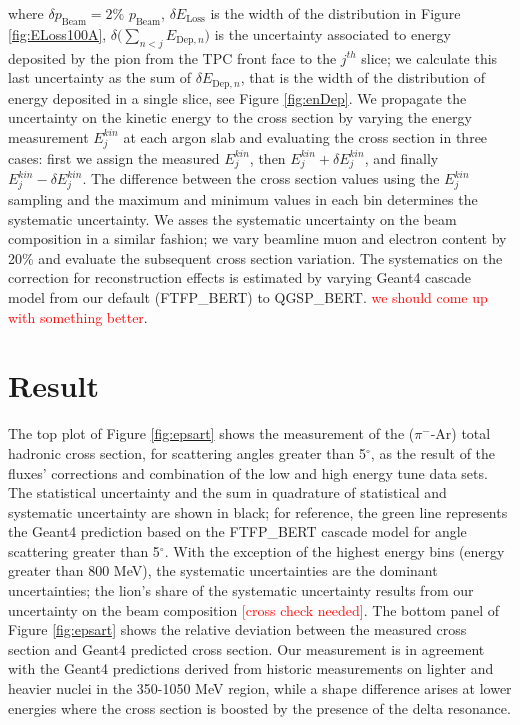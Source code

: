 \documentclass[aps,prl,twocolumn,showpacs,superscriptaddress,groupedaddress]{revtex4}  %
\begin{document}
where $\delta p_{\text{Beam}} = 2\%$ $p_{\text{Beam}}$, $\delta E_{\text{Loss}}$ is the width of the distribution in Figure \ref{fig:ELoss100A}, $\delta \Big(\sum_{n < j} E_{\text{Dep},n}\Big)$  is the uncertainty associated to energy deposited by the pion from the TPC front face to the $j^{th}$ slice; we calculate this last uncertainty as  the sum of $\delta E_{\text{Dep},n}$, that is the width  of the  distribution of energy deposited in a single slice, see Figure \ref{fig:enDep}. We propagate the uncertainty on the kinetic energy to the cross section by varying the energy measurement $E^{kin}_{j}$ at each argon slab and evaluating the cross section in three cases: first we assign the measured $E^{kin}_{j}$, then  $E^{kin}_{j} + \delta E^{kin}_{j}$, and finally  $E^{kin}_{j} - \delta E^{kin}_{j}$. The difference between the cross section values using the $E^{kin}_{j}$ sampling and the maximum and minimum values in each bin determines the systematic uncertainty. We asses the systematic uncertainty on the beam composition in a similar fashion; we vary beamline muon and electron content by 20\% and evaluate the subsequent cross section variation.  The systematics on the correction for reconstruction effects is estimated by varying Geant4 cascade model from our default (FTFP\_BERT) to QGSP\_BERT.  \textcolor{red}{we should come up with something better}. 



\section{\label{sec:Results}Result}
The top plot of Figure \ref{fig:epsart} shows the measurement of the ($\pi^-$-Ar) total hadronic cross section,  for  scattering angles greater than 5$^\circ$, as the result of the fluxes' corrections and combination of the low and high energy tune data sets. The statistical uncertainty and the sum in quadrature of statistical and systematic uncertainty are shown in black; for reference, the green line represents the Geant4 prediction based on the FTFP\_BERT cascade model  for angle scattering greater than 5$^\circ$. 
With the exception of the highest energy bins (energy greater than 800 MeV), the systematic uncertainties are the dominant uncertainties; the lion's share of the systematic uncertainty results from our uncertainty on the beam composition \textcolor{red}{[cross check needed]}. The bottom panel of Figure  \ref{fig:epsart} shows the relative deviation between the measured cross section and  Geant4 predicted cross section.
Our measurement is in agreement with the Geant4 predictions derived from historic measurements on lighter and heavier nuclei in the 350-1050 MeV region, while a shape difference arises at lower energies where the cross section is boosted by the presence of the delta resonance.
\end{document}

